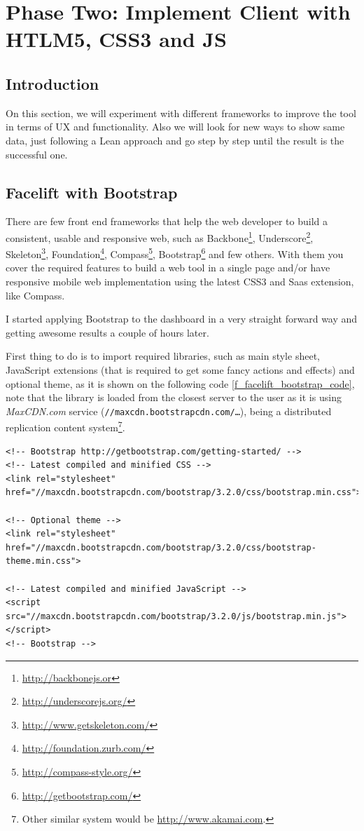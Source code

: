 \part{Phase Two: Implement Client with HTLM5, CSS3 and JS}

\chapter*{Introduction}
\label{c_phasetwo}
On this section, we will experiment with different frameworks to improve the
tool in terms of UX and functionality. Also we will look for new ways to show
same data, just following a Lean approach and go step by step until the result
is the successful one.


\chapter{Facelift with Bootstrap}
There are few front end frameworks that help the web developer to build a
consistent, usable and responsive web, such as
Backbone\footnote{\url{http://backbonejs.or}}, 
Underscore\footnote{\url{http://underscorejs.org/}},
Skeleton\footnote{\url{http://www.getskeleton.com/}},
Foundation\footnote{\url{http://foundation.zurb.com/}},
Compass\footnote{\url{http://compass-style.org/}},
Bootstrap\footnote{\url{http://getbootstrap.com/}} and few others. With them
you cover the required features to build a web tool in a
single page and/or have responsive mobile web implementation using the latest
CSS3 and Saas extension, like Compass.

I started applying Bootstrap to the dashboard in a very straight forward way and
getting awesome results a couple of hours later.

First thing to do is to import required libraries, such as main style sheet,
JavaScript extensions (that is required to get some fancy actions and effects)
and optional theme, as it is shown on the following code
\ref{f_facelift_bootstrap_code}, note that the library is loaded from the
closest server to the user as it is using \emph{MaxCDN.com} service
(\texttt{//maxcdn.bootstrapcdn.com/\ldots}), being a distributed replication
content system\footnote{Other similar system would be
\url{http://www.akamai.com}.}.

\begin{lstlisting}[style=html,breaklines=true,caption=Bootstrap\
required\ libraries,label=f_facelift_bootstrap_code]
<!-- Bootstrap http://getbootstrap.com/getting-started/ --> 
<!-- Latest compiled and minified CSS --> 
<link rel="stylesheet" href="//maxcdn.bootstrapcdn.com/bootstrap/3.2.0/css/bootstrap.min.css">

<!-- Optional theme -->
<link rel="stylesheet" href="//maxcdn.bootstrapcdn.com/bootstrap/3.2.0/css/bootstrap-theme.min.css">

<!-- Latest compiled and minified JavaScript -->
<script src="//maxcdn.bootstrapcdn.com/bootstrap/3.2.0/js/bootstrap.min.js"></script>
<!-- Bootstrap -->
\end{lstlisting} 

